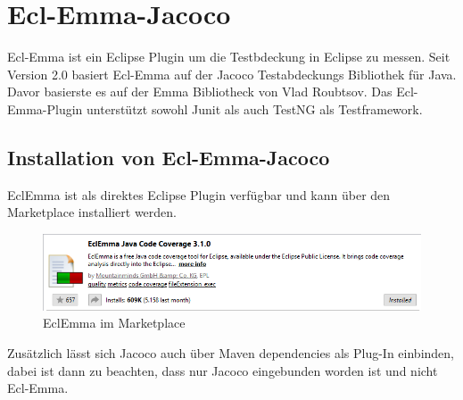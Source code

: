 \documentclass[a4paper]{article}
\author{Mario Groneick, Marcel Brockskothen}
\begin{document}

\tableofcontents
\section{Ecl-Emma-Jacoco}
Ecl-Emma ist ein Eclipse Plugin um die Testbdeckung in Eclipse zu messen.
Seit Version 2.0 basiert Ecl-Emma auf der Jacoco Testabdeckungs Bibliothek für Java.
Davor basierste es auf der Emma Bibliotheck von Vlad Roubtsov. Das Ecl-Emma-Plugin unterstützt
sowohl Junit als auch TestNG als Testframework.
\subsection{Installation von Ecl-Emma-Jacoco}
EclEmma ist als direktes Eclipse Plugin verfügbar und kann über den Marketplace installiert werden. 
\begin{figure}[h]
\includegraphics[scale=0.5]{EclEmma_Marketplace.png}
\caption{EclEmma im Marketplace}
\centering
\end{figure}
Zusätzlich lässt sich Jacoco auch über Maven dependencies als Plug-In einbinden, dabei ist dann zu beachten, dass nur Jacoco eingebunden worden ist und nicht Ecl-Emma. 
\end{document}
